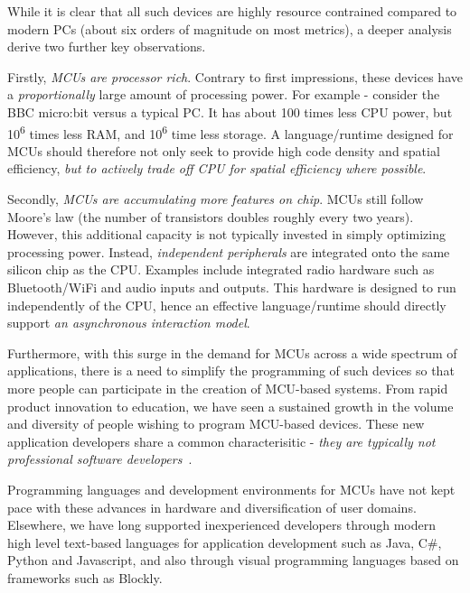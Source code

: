 While it is clear that all such devices are highly resource contrained compared to modern PCs
(about six orders of magnitude on most metrics), a deeper analysis derive two further key observations.

Firstly, \emph{MCUs are processor rich}. Contrary to first impressions, these devices have
a \emph{proportionally} large amount of processing power. For example - consider the BBC micro:bit
versus a typical PC. It has about 100 times less CPU power, but 10\textsuperscript{6} times less RAM,
and 10\textsuperscript{6} time less storage. A language/runtime designed for MCUs should therefore not
only seek to provide high code density and spatial efficiency,
\emph{but to actively trade off CPU for spatial efficiency where possible}.

Secondly, \emph{MCUs are accumulating more features on chip}.
MCUs still follow Moore's law (the number of transistors doubles roughly every two years).
However, this additional capacity is
not typically invested in simply optimizing processing power. Instead, \emph{independent peripherals}
are integrated onto the same silicon chip as the CPU. Examples include integrated radio hardware such
as Bluetooth/WiFi and audio inputs and outputs. This hardware is designed to run independently of the
CPU, hence an effective language/runtime should directly support \emph{an asynchronous
interaction model}.

Furthermore, with this surge in the demand for MCUs across a wide spectrum of applications,
there is a need to simplify the programming of such devices so that more people can participate in
the creation of MCU-based systems. From rapid product innovation to education,
we have seen a sustained growth in the volume and diversity of people wishing to program MCU-based devices. These new application developers share a common characterisitic - \emph{they are typically not professional software developers}~\cite{dougherty2012maker,bruce2015make,maksimovic2014raspberry}.

Programming languages and development environments for MCUs have not kept pace with these advances
in hardware and diversification of user domains. Elsewhere, we have long supported inexperienced developers through
modern high level text-based languages for application development such as Java, C\#, Python and Javascript, and also
through visual programming languages based on frameworks such as Blockly.

